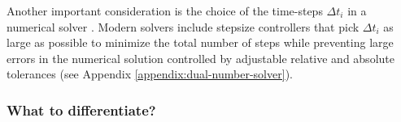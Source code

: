 Another important consideration is the choice of the time-steps $\Delta t_i$ in a numerical solver \cite{hairer-solving-1}. 
Modern solvers include stepsize controllers that pick $\Delta t_i$ as large as possible to minimize the total number of steps while preventing large errors in the numerical solution controlled by adjustable relative and absolute tolerances (see Appendix \ref{appendix:dual-number-solver}). 




\subsubsection{What to differentiate?}

